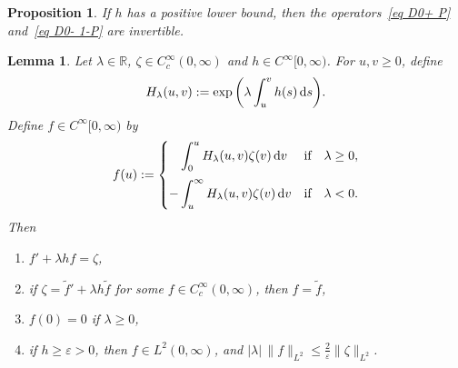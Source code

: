 \documentclass[pdftex]{sigma}%
\numberwithin{equation}{section}
\newtheorem{Lemma}[Theorem]{Lemma}
\newtheorem{Proposition}[Theorem]{Proposition}
 { \theoremstyle{definition}
\newtheorem{Definition}[Theorem]{Definition}
\newtheorem{Note}[Theorem]{Note}
\newtheorem{Example}[Theorem]{Example}
\newtheorem{Remark}[Theorem]{Remark} }
\newcommand{\R}{\mathbb{R}}
\begin{document}
\begin{Proposition}\label{prop APS cusp}
If $h$ has a positive lower bound, then the operators~\eqref{eq D0+ P} and~\eqref{eq D0- 1-P} are invertible.
\end{Proposition}

\begin{Lemma}\label{lem f g}
Let $\lambda \in \R$, $\zeta \in C^{\infty}_c(0,\infty)$ and $h \in C^{\infty}[0,\infty)$. For $u,v\geq 0$, define
\[
H_{\lambda}(u,v) := \exp\bigg( \lambda \int_u^v h(s)\, {\rm d}s \bigg).
\]
Define $f \in C^{\infty}[0,\infty)$ by
\begin{equation} \label{eq def f}
f(u) :=
\begin{cases}
\displaystyle\phantom{-}\int_0^u H_{\lambda}(u,v)\zeta(v)\, {\rm d}v & \text{if\quad $\lambda \geq 0$},
\\[4mm]
\displaystyle-\int_u^{\infty} H_{\lambda}(u,v)\zeta(v)\, {\rm d}v & \text{if\quad $\lambda <0$}.
\end{cases}
\end{equation}
Then
\begin{enumerate}\itemsep=0pt
\item[$(1)$] $f'+\lambda h f = \zeta$,
\item[$(2)$] if $\zeta = \tilde f'+\lambda h \tilde f$ for some $f \in C^{\infty}_c(0, \infty)$, then $f = \tilde f$,
\item[$(3)$] $f(0) = 0$ if $\lambda \geq 0$,
\item[$(4)$] if $h \geq \varepsilon>0$, then
$f \in L^2(0,\infty)$, and $|\lambda|\, \|f\|_{L^2} \leq \frac{2}{\varepsilon}\|\zeta\|_{L^2}$.
\end{enumerate}
\end{Lemma}
\end{document}
